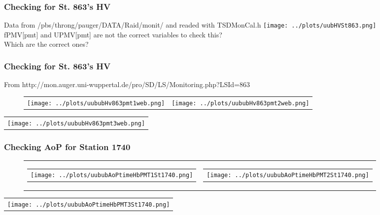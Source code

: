 \documentclass[aspectratio=169]{beamer}
\begin{document}
\begin{frame}
  \frametitle{Checking for St. 863's HV}
  Data from /pbs/throng/pauger/DATA/Raid/monit/ and readed with TSDMonCal.h
  \centering
  \texttt{[image: ../plots/uubHVSt863.png]}
  \\
  \small
  fPMV[pmt] and UPMV[pmt] are not the correct variables to check this?
  \\
  Which are the correct ones?
\end{frame}

\begin{frame}
  \frametitle{Checking for St. 863's HV}
  From http://mon.auger.uni-wuppertal.de/pro/SD/LS/Monitoring.php?LSId=863
  \begin{figure}
    \centering
    \begin{tabularx}{\textwidth}{CC}
      \texttt{[image: ../plots/uububHv863pmt1web.png]}
      &
      \texttt{[image: ../plots/uububHv863pmt2web.png]}
    \end{tabularx}
  \end{figure}
  \begin{center}
    \begin{tabular}{l}
      \texttt{[image: ../plots/uububHv863pmt3web.png]}
    \end{tabular}
  \end{center}
\end{frame}


\begin{frame}
  \frametitle{Checking AoP for Station 1740}
  \begin{figure}
    \centering
    \begin{tabularx}{\textwidth}{CC}
      \begin{tabular}{l}
        \texttt{[image: ../plots/uububAoPtimeHbPMT1St1740.png]}
      \end{tabular}
      &
      \begin{tabular}{l}
        \texttt{[image: ../plots/uububAoPtimeHbPMT2St1740.png]}
      \end{tabular}
      \\
    \end{tabularx}
  \end{figure}

  \begin{center}
    \begin{tabular}{l}
      \texttt{[image: ../plots/uububAoPtimeHbPMT3St1740.png]}
    \end{tabular} 
  \end{center}
\end{frame}
\end{document}
